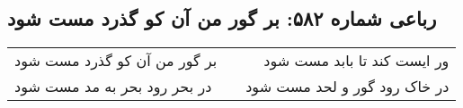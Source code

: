 \begin{center}
\section*{رباعی شماره ۵۸۲: بر گور من آن کو گذرد مست شود}
\label{sec:0582}
\begin{longtable}{l p{0.5cm} r}
بر گور من آن کو گذرد مست شود
&&
ور ایست کند تا بابد مست شود
\\
در بحر رود بحر به مد مست شود
&&
در خاک رود گور و لحد مست شود
\\
\end{longtable}
\end{center}
